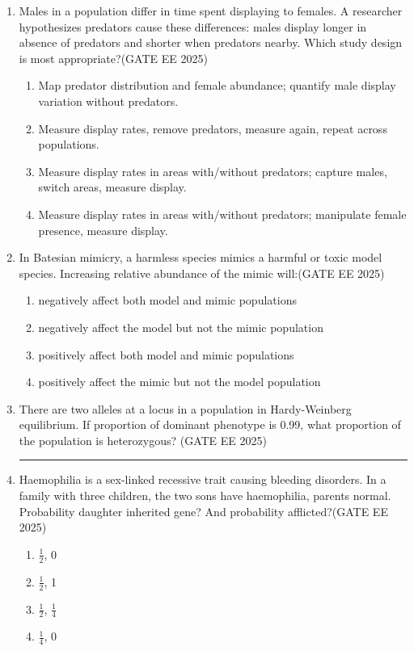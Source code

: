 \begin{enumerate}[leftmargin=*,label=\textbf{Q.\arabic*},resume]
\item Males in a population differ in time spent displaying to females. A researcher hypothesizes predators cause these differences: males display longer in absence of predators and shorter when predators nearby. Which study design is most appropriate?\hfill {(GATE EE 2025)}
\begin{multicols}{2}
\begin{enumerate}
\item Map predator distribution and female abundance; quantify male display variation without predators.
\item Measure display rates, remove predators, measure again, repeat across populations.
\item Measure display rates in areas with/without predators; capture males, switch areas, measure display.
\item Measure display rates in areas with/without predators; manipulate female presence, measure display.
\end{enumerate}
\end{multicols}

\item In Batesian mimicry, a harmless species mimics a harmful or toxic model species. Increasing relative abundance of the mimic will:\hfill {(GATE EE 2025)}
\begin{multicols}{2}
\begin{enumerate}
\item negatively affect both model and mimic populations
\item negatively affect the model but not the mimic population
\item positively affect both model and mimic populations
\item positively affect the mimic but not the model population
\end{enumerate}
\end{multicols}

\item There are two alleles at a locus in a population in Hardy-Weinberg equilibrium. If proportion of dominant phenotype is 0.99, what proportion of the population is heterozygous?
\hfill {(GATE EE 2025)}
\rule{4cm}{0.15mm}

\item Haemophilia is a sex-linked recessive trait causing bleeding disorders. In a family with three children, the two sons have haemophilia, parents normal. Probability daughter inherited gene? And probability afflicted?\hfill {(GATE EE 2025)}
\begin{multicols}{2}
\begin{enumerate}
\item $\frac{1}{2}$, 0
\item $\frac{1}{2}$, 1
\item $\frac{1}{2}$, $\frac{1}{4}$
\item $\frac{1}{4}$, 0
\end{enumerate}
\end{multicols}

\end{enumerate}

